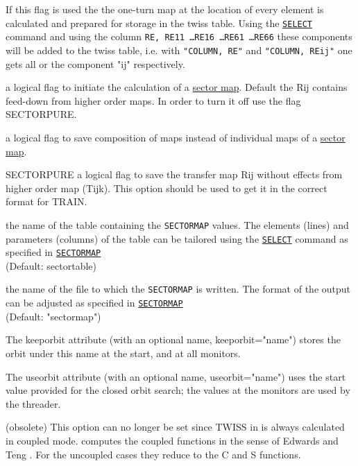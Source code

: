 \begin{madlist}
   If this flag is used the the one-turn map at the
  location of every element is calculated and prepared for
  storage in the twiss table. Using the
  \hyperref[sec:select]{\texttt{SELECT}} command and using
  the column \texttt{RE, RE11 \ldots RE16 \ldots RE61 \ldots RE66} these
  components will be added to the twiss table, i.e. with \texttt{"COLUMN, RE"} and
  \texttt{"COLUMN, REij"} one gets all or the component "ij" respectively.    

   a logical flag to initiate the calculation of a 
  \hyperref[sec:sectormap]{sector map}. Default the Rij contains feed-down from higher order maps. In order to turn it off use the flag SECTORPURE. 
  
   a logical flag to save composition of maps instead of individual maps of a
  \hyperref[sec:sectormap]{sector map}.

  \item{SECTORPURE} a logical flag to save the transfer map Rij without effects from higher order map (Tijk). This option should be used to get it in the correct format for TRAIN.

   the name of the table containing the \texttt{SECTORMAP}
  values. The elements (lines) and parameters (columns) 
  of the table can be tailored using the \hyperref[sec:select]{\texttt{SELECT}} 
  command as specified in \hyperref[sec:sectormap]{\texttt{SECTORMAP}} \\
  (Default: sectortable)

   the name of the file to which the \texttt{SECTORMAP} is
  written. 
  The format of the output can be adjusted as specified in 
  \hyperref[sec:sectormap]{\texttt{SECTORMAP}} \\
  (Default: "sectormap")
  
   The keeporbit attribute (with an optional name,
  keeporbit="name") stores the orbit under this name at the
  start, and at all monitors.    

   The useorbit attribute (with an optional name,
  useorbit="name") uses the start value provided for the closed
  orbit search; the values at the monitors are used by the
  threader.    

   (obsolete) This \madeight option can no
  longer be set since TWISS in \madx is always calculated in
  coupled mode. \madx computes the coupled functions in the
  sense of Edwards and Teng \cite{edwards1973}. 
  For the uncoupled cases they reduce to the C and S functions.    
  

\end{madlist}
